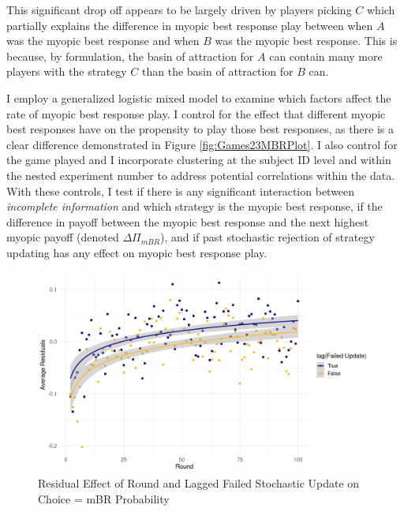 This significant drop off appears to be largely driven by players picking $C$ which partially explains the difference in myopic best response play between when $A$ was the myopic best response and when $B$ was the myopic best response. This is because, by formulation, the basin of attraction for $A$ can contain many more players with the strategy $C$ than the basin of attraction for $B$ can.


I employ a generalized logistic mixed model to examine which factors affect the rate of myopic best response play. I control for the effect that different myopic best responses have on the propensity to play those best responses, as there is a clear difference demonstrated in Figure \ref{fig:Games23MBRPlot}. I also control for the game played and I incorporate clustering at the subject ID level and within the nested experiment number to address potential correlations within the data.
With these controls, I test if there is any significant interaction between \textit{incomplete information} and which strategy is the myopic best response, if the difference in payoff between the myopic best response and the next highest myopic payoff (denoted $\Delta\Pi_{mBR}$), and if past stochastic rejection of strategy updating has any effect on myopic best response play. 

\begin{figure}[h]
\captionsetup{justification=centering}
  \caption{Residual Effect of Round and Lagged Failed Stochastic Update on Choice = mBR Probability}
   \label{fig:Residual}
\vskip12pt
\includegraphics[width = \textwidth]{Images/ResidualPickMBR_round_lagChange.png}
\end{figure}

